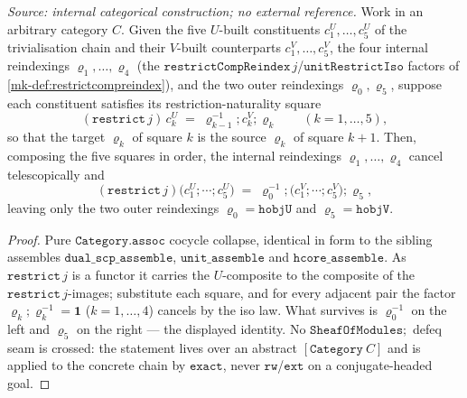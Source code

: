 \begin{lemma}\label{mk-lem:trivialisation_telescope_assemble}
  \leanok

  \textit{Source: internal categorical construction; no external reference.}
  Work in an arbitrary category \(C\). Given the five \(U\)-built constituents \(c^U_1, \dots, c^U_5\)
  of the trivialisation chain and their \(V\)-built counterparts \(c^V_1, \dots, c^V_5\), the four
  internal reindexings \(\varrho_1, \dots, \varrho_4\) (the
  \(\mathtt{restrictCompReindex}\,j\)/\(\mathtt{unitRestrictIso}\) factors of
  \ref{mk-def:restrictcompreindex}), and the two outer reindexings \(\varrho_0, \varrho_5\), suppose each
  constituent satisfies its restriction-naturality square
  \[
    (\mathtt{restrict}\,j)\,c^U_k \;=\; \varrho_{k-1}^{-1} \mathbin{;} c^V_k \mathbin{;} \varrho_k
    \qquad (k = 1, \dots, 5),
  \]
  so that the target \(\varrho_k\) of square \(k\) is the source \(\varrho_k\) of square \(k+1\). Then,
  composing the five squares in order, the internal reindexings \(\varrho_1, \dots, \varrho_4\) cancel
  telescopically and
  \[
    (\mathtt{restrict}\,j)\bigl(c^U_1 \mathbin{;} \cdots \mathbin{;} c^U_5\bigr)
      \;=\; \varrho_0^{-1} \mathbin{;} \bigl(c^V_1 \mathbin{;} \cdots \mathbin{;} c^V_5\bigr) \mathbin{;} \varrho_5,
  \]
  leaving only the two outer reindexings \(\varrho_0 = \mathtt{hobjU}\) and \(\varrho_5 = \mathtt{hobjV}\).
\end{lemma}
\begin{proof}
  \leanok

Pure \(\mathtt{Category.assoc}\) cocycle collapse, identical in form to the sibling assembles
  \(\mathtt{dual\_scp\_assemble}\), \(\mathtt{unit\_assemble}\) and \(\mathtt{hcore\_assemble}\). As
  \(\mathtt{restrict}\,j\) is a functor it carries the \(U\)-composite to the composite of the
  \(\mathtt{restrict}\,j\)-images; substitute each square, and for every adjacent pair the factor
  \(\varrho_k \mathbin{;} \varrho_k^{-1} = \mathbf{1}\) (\(k = 1, \dots, 4\)) cancels by the iso law.
  What survives is \(\varrho_0^{-1}\) on the left and \(\varrho_5\) on the right --- the displayed
  identity. No \(\mathtt{SheafOfModules} \mathbin{;}\) defeq seam is crossed: the statement lives over an
  abstract \([\mathtt{Category}\ C]\) and is applied to the concrete chain by \(\mathtt{exact}\), never
  \(\mathtt{rw}\)/\(\mathtt{ext}\) on a conjugate-headed goal.
\end{proof}

